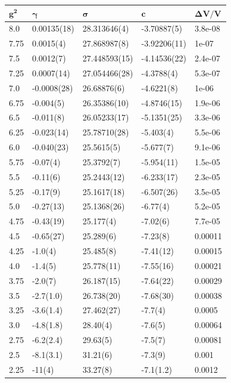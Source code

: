 \begin{table}[!hb]
\centering
\begin{tabular}{lllll}
    $\mathbf{g^2}$ & $\mathbf{\gamma}$ & $\mathbf{\sigma}$ & $\mathbf{c}$ & $\mathbf{\Delta V/V}$ \\ \hline
   8.0 & 0.00135(18) & 28.313646(4) & -3.70887(5) & 3.8e-08 \\
   7.75 & 0.0015(4) & 27.868987(8) & -3.92206(11) & 1e-07 \\
   7.5 & 0.0012(7) & 27.448593(15) & -4.14536(22) & 2.4e-07 \\
   7.25 & 0.0007(14) & 27.054466(28) & -4.3788(4) & 5.3e-07 \\
   7.0 & -0.0008(28) & 26.68876(6) & -4.6221(8) & 1e-06 \\
   6.75 & -0.004(5) & 26.35386(10) & -4.8746(15) & 1.9e-06 \\
   6.5 & -0.011(8) & 26.05233(17) & -5.1351(25) & 3.3e-06 \\
   6.25 & -0.023(14) & 25.78710(28) & -5.403(4) & 5.5e-06 \\
   6.0 & -0.040(23) & 25.5615(5) & -5.677(7) & 9.1e-06 \\
   5.75 & -0.07(4) & 25.3792(7) & -5.954(11) & 1.5e-05 \\
   5.5 & -0.11(6) & 25.2443(12) & -6.233(17) & 2.3e-05 \\
   5.25 & -0.17(9) & 25.1617(18) & -6.507(26) & 3.5e-05 \\
   5.0 & -0.27(13) & 25.1368(26) & -6.77(4) & 5.2e-05 \\
   4.75 & -0.43(19) & 25.177(4) & -7.02(6) & 7.7e-05 \\
   4.5 & -0.65(27) & 25.289(6) & -7.23(8) & 0.00011 \\
   4.25 & -1.0(4) & 25.485(8) & -7.41(12) & 0.00015 \\
   4.0 & -1.4(5) & 25.778(11) & -7.55(16) & 0.00021 \\
   3.75 & -2.0(7) & 26.187(15) & -7.64(22) & 0.00029 \\
   3.5 & -2.7(1.0) & 26.738(20) & -7.68(30) & 0.00038 \\
   3.25 & -3.6(1.4) & 27.462(27) & -7.7(4) & 0.0005 \\
   3.0 & -4.8(1.8) & 28.40(4) & -7.6(5) & 0.00064 \\
   2.75 & -6.2(2.4) & 29.63(5) & -7.5(7) & 0.00081 \\
   2.5 & -8.1(3.1) & 31.21(6) & -7.3(9) & 0.001 \\
   2.25 & -11(4) & 33.27(8) & -7.1(1.2) & 0.0012 \\

\end{tabular}
\end{table}
